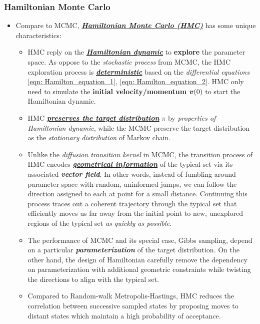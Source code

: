 \documentclass[11pt]{article}
\begin{document}
\subsubsection{Hamiltonian Monte Carlo}
\begin{itemize}
\item Compare to MCMC, \underline{\emph{\textbf{Hamiltonian Monte Carlo (HMC)}}} \citep{brooks2011handbook} has some unique characteristics:
\begin{itemize}
\item HMC reply on the \underline{\textbf{\emph{Hamiltonian dynamic}}} to \textbf{explore} the parameter space. As oppose to the \emph{stochastic process} from MCMC, the HMC exploration process is \underline{\emph{\textbf{deterministic}}} based on the \emph{differential equations} \eqref{eqn: Hamilton_equation_1}, \eqref{eqn: Hamilton_equation_2}. HMC only need to simulate the \textbf{initial velocity/momentum} $\boldsymbol{v}(0)$ to start the Hamiltonian dynamic.

\item HMC \underline{\textbf{\emph{preserves the target distribution}}} $\pi$ by \emph{properties of Hamiltonian dynamic}, while the MCMC preserve the target distribution as the \emph{stationary distribution} of Markov chain.

\item Unlike the \emph{diffusion transition kernel} in MCMC, the transition process of HMC encodes \underline{\emph{\textbf{geometrical information}}} of the typical set via its associated \emph{\textbf{vector field}}. In other words, instead of fumbling around parameter space with random, uninformed jumps, we can follow the direction assigned to each at point for a small distance.  Continuing this process traces out a coherent trajectory through the typical set that efficiently moves us far away from the initial point to new, unexplored regions of the typical set \emph{as quickly as possible}.  

\item The performance of MCMC and its special case, Gibbs sampling, depend on a particular \emph{\textbf{parameterization}} of the target distribution. On the other hand, the design of Hamiltonian carefully remove the dependency on parameterization with additional geometric constraints while twisting the directions to align with the typical set. 

\item Compared to Random-walk Metropolis-Hastings, HMC reduces the correlation between successive sampled states by proposing moves to distant states which maintain a high probability of acceptance.
\end{itemize}


\end{itemize}
\end{document}
